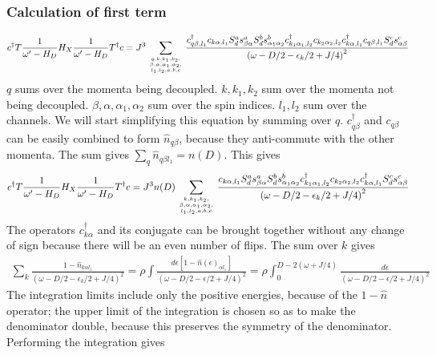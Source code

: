\documentclass[12pt]{revtex4-2}
\begin{document}
\subsubsection{Calculation of first term}
\begin{align}
	c^\dagger T \frac{1}{\omega^\prime - H_D} H_X \frac{1}{\omega^\prime - H_D} T^\dagger c = J^3\sum_{q, k, k_1,k_2,\atop{\beta, \alpha, \alpha_1,\alpha_2,\atop{l_1,l_2,a,b,c}}} \frac{c^\dagger_{q\beta,l_1} c_{k\alpha,l_1} S_d^a s^a_{\beta \alpha} S_d^b s^b_{\alpha_1 \alpha_2} c^\dagger_{k_1\alpha_1,l_2}c_{k_2 \alpha_2,l_2} c^\dagger_{k\alpha, l_1} c_{q\beta, l_1} S_d^c s^c_{\alpha \beta}}{\left(\omega - D/2 -\epsilon_k/2 + J/4\right)^2}
\end{align}
\(q\) sums over the momenta being decoupled. \(k, k_1,k_2\) sum over the momenta not being decoupled. \(\beta, \alpha, \alpha_1,\alpha_2\) sum over the spin indices. \(l_1,l_2\) sum over the channels. We will start simplifying this equation by summing over \(q\). \(c^\dagger_{q\beta}\) and \(c_{q\beta}\) can be easily combined to form \(\hat n_{q\beta}\), because they anti-commute with the other momenta. The sum gives \(\sum_q \hat n_{q\beta l_1} = n(D) \). This gives
\begin{align}
	c^\dagger T \frac{1}{\omega^\prime - H_D} H_X \frac{1}{\omega^\prime - H_D} T^\dagger c = J^3 n(D)\sum_{k, k_1,k_2,\atop{\beta, \alpha, \alpha_1,\alpha_2,\atop{l_1,l_2,a,b,c}}} \frac{c_{k\alpha,l_1} S_d^a s^a_{\beta \alpha} S_d^b s^b_{\alpha_1 \alpha_2} c^\dagger_{k_1\alpha_1,l_2}c_{k_2 \alpha_2,l_2} c^\dagger_{k\alpha, l_1} S_d^c s^c_{\alpha \beta}}{\left(\omega - D/2 -\epsilon_k/2 + J/4\right)^2}
\end{align}
The operators \(c^\dagger_{k\alpha}\) and its conjugate can be brought together without any change of sign because there will be an even number of flips. The sum over \(k\) gives
\begin{align}
	\sum_k \frac{1 - \hat n_{k\alpha l_1}}{\left(\omega - D/2 -\epsilon_k/2 + J/4\right)^2} =  \rho\int \frac{d\epsilon\left[1 - \hat n(\epsilon)_{\alpha l_1}\right] }{\left(\omega - D/2 -\epsilon/2 + J/4\right)^2} = \rho\int_0^{D-2\left( \omega + J/4 \right) } \frac{d\epsilon}{\left(\omega - D/2 -\epsilon/2 + J/4\right)^2}
\end{align}
The integration limits include only the positive energies, because of the \(1 - \hat n\) operator; the upper limit of the integration is chosen so as to make the denominator double, because this preserves the symmetry of the denominator. Performing the integration gives
\end{document}
